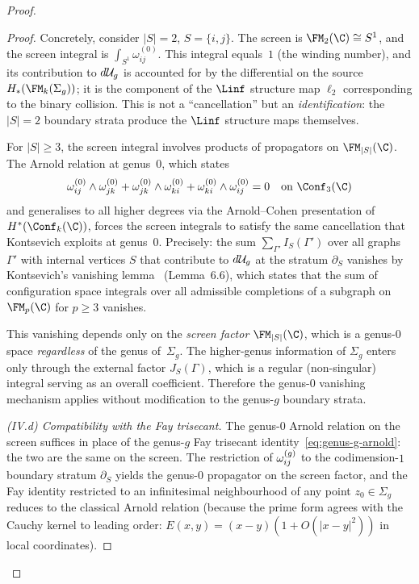 \begin{proof}
\begin{proof}
Concretely, consider $|S| = 2$, $S = \{i,j\}$.
The screen is $\FM_2(\C) \cong S^1$, and the screen integral
is $\int_{S^1} \omega^{(0)}_{ij}$. This integral equals~$1$
(the winding number), and its contribution to $d\mathcal{U}_g$ is
accounted for by the differential on the source
$H_\ast(\FMg{k})$; it is the component of the $\Linf$
structure map $\ell_2$ corresponding to the binary collision.
This is not a ``cancellation'' but an \emph{identification}:
the $|S| = 2$ boundary strata produce the $\Linf$ structure
maps themselves.

For $|S| \ge 3$, the screen integral involves products of
propagators on $\FM_{|S|}(\C)$. The Arnold relation at
genus~$0$, which states
\begin{equation}\label{eq:arnold-genus0-repeat}
 \omega^{(0)}_{ij} \wedge \omega^{(0)}_{jk}
 + \omega^{(0)}_{jk} \wedge \omega^{(0)}_{ki}
 + \omega^{(0)}_{ki} \wedge \omega^{(0)}_{ij}
 = 0
 \quad\text{on } \Conf_3(\C)
\end{equation}
and generalises to all higher degrees via the
Arnold--Cohen presentation of $H^\ast(\Conf_k(\C))$,
forces the screen integrals to satisfy the same
cancellation that Kontsevich exploits at genus~$0$. Precisely:
the sum $\sum_{\Gamma'} I_S(\Gamma')$ over all graphs
$\Gamma'$ with internal vertices $S$ that contribute to
$d\mathcal{U}_g$ at the stratum $\partial_S$ vanishes by
Kontsevich's vanishing lemma~\cite{Kon03} (Lemma~6.6),
which states that the sum of configuration space integrals
over all admissible completions of a subgraph on $\FM_p(\C)$
for $p \ge 3$ vanishes.

This vanishing depends only on
the \emph{screen factor} $\FM_{|S|}(\C)$, which is a
genus-$0$ space \emph{regardless} of the genus of~$\Sigma_g$.
The higher-genus information of $\Sigma_g$ enters only through
the external factor $J_S(\Gamma)$, which is a regular
(non-singular) integral serving as an overall coefficient.
Therefore the genus-$0$ vanishing mechanism applies without
modification to the genus-$g$ boundary strata.

\medskip\noindent
\emph{(IV.d) Compatibility with the Fay trisecant.}
The genus-$0$ Arnold relation on
the screen suffices in place of the genus-$g$ Fay trisecant
identity~\eqref{eq:genus-g-arnold}: the
two are the same on the screen. The restriction of
$\omega^{(g)}_{ij}$ to the codimension-$1$ boundary stratum
$\partial_S$ yields the genus-$0$ propagator on the screen
factor, and the Fay identity restricted to an infinitesimal
neighbourhood of any point $z_0 \in \Sigma_g$ reduces to
the classical Arnold relation (because the prime form agrees
with the Cauchy kernel to leading order:
$E(x,y) = (x - y)(1 + O(|x-y|^2))$ in local coordinates).


\end{proof}
\end{proof}
